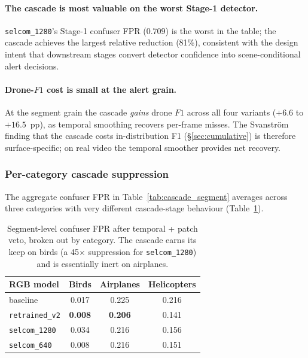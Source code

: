 \paragraph{The cascade is most valuable on the worst Stage-1 detector.}
\texttt{selcom\_1280}'s Stage-1 confuser FPR ($0.709$) is the worst in the table; the cascade achieves the largest relative reduction (81\%), consistent with the design intent that downstream stages convert detector confidence into scene-conditional alert decisions.

\paragraph{Drone-$F1$ cost is small at the alert grain.}
At the segment grain the cascade \emph{gains} drone $F1$ across all four variants ($+6.6$ to $+16.5$~pp), as temporal smoothing recovers per-frame misses. The Svanstr\"om finding that the cascade costs in-distribution F1 (\S\ref{sec:cumulative}) is therefore surface-specific; on real video the temporal smoother provides net recovery.

\subsubsection{Per-category cascade suppression}
\label{sec:realvideo_percategory}

The aggregate confuser FPR in Table~\ref{tab:cascade_segment} averages across three categories with very different cascade-stage behaviour (Table~\ref{tab:cascade_percategory}).

\begin{table}[htbp]
    \centering
    \caption{Segment-level confuser FPR after temporal + patch veto, broken out by category. The cascade earns its keep on birds (a 45$\times$ suppression for \texttt{selcom\_1280}) and is essentially inert on airplanes.}
    \label{tab:cascade_percategory}
    \begin{tabular}{lccc}
        \toprule
        RGB model & Birds & Airplanes & Helicopters \\
        \midrule
        baseline           & 0.017 & 0.225 & 0.216 \\
        \texttt{retrained\_v2} & \textbf{0.008} & \textbf{0.206} & 0.141 \\
        \texttt{selcom\_1280}  & 0.034 & 0.216 & 0.156 \\
        \texttt{selcom\_640}   & 0.008 & 0.216 & 0.151 \\
        \bottomrule
    \end{tabular}
\end{table}

